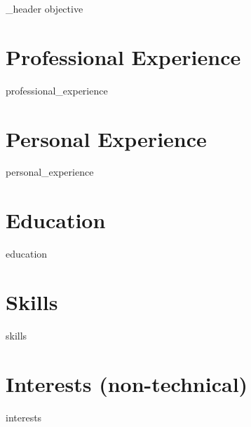 \documentclass[letter,10pt]{article}
\author{Dillon Stadther}
\begin{document}
{_header}
{objective}

\section{Professional Experience}
{professional_experience}

\section{Personal Experience}
{personal_experience}

\section{Education}
{education}

\section{Skills}
{skills}


\section{Interests (non-technical)}
{interests}
\end{document}
